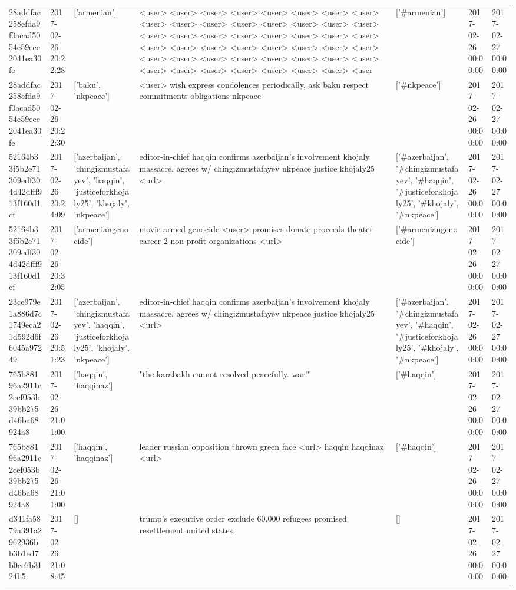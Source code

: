 \begin{tabular}{lllllll}
28addfac258efda9f0acad5054e59eee2041ea30fe & 2017-02-26 20:22:28 & ['armenian'] & <user> <user> <user> <user> <user> <user> <user> <user> <user> <user> <user> <user> <user> <user> <user> <user> <user> <user> <user> <user> <user> <user> <user> <user> <user> <user> <user> <user> <user> <user> <user> <user> <user> <user> <user> <user> <user> <user> <user> <user> <user> <user> <user> <user> <user> <user> <user> <user & ['#armenian'] & 2017-02-26 00:00:00 & 2017-02-27 00:00:00 \\
28addfac258efda9f0acad5054e59eee2041ea30fe & 2017-02-26 20:22:30 & ['baku', 'nkpeace'] & <user> wish express condolences periodically, ask baku respect commitments obligations nkpeace & ['#nkpeace'] & 2017-02-26 00:00:00 & 2017-02-27 00:00:00 \\
52164b33f5b2e71309edf304d42dfff913f160d1cf & 2017-02-26 20:24:09 & ['azerbaijan', 'chingizmustafayev', 'haqqin', 'justiceforkhojaly25', 'khojaly', 'nkpeace'] & editor-in-chief haqqin confirms azerbaijan's involvement khojaly massacre. agrees w/ chingizmustafayev nkpeace justice khojaly25 <url> & ['#azerbaijan', '#chingizmustafayev', '#haqqin', '#justiceforkhojaly25', '#khojaly', '#nkpeace'] & 2017-02-26 00:00:00 & 2017-02-27 00:00:00 \\
52164b33f5b2e71309edf304d42dfff913f160d1cf & 2017-02-26 20:32:05 & ['armeniangenocide'] & movie armed genocide <user> promises donate proceeds theater career 2 non-profit organizations <url> & ['#armeniangenocide'] & 2017-02-26 00:00:00 & 2017-02-27 00:00:00 \\
23ce979e1a886d7c1749eca21d592d6f6045a97249 & 2017-02-26 20:51:23 & ['azerbaijan', 'chingizmustafayev', 'haqqin', 'justiceforkhojaly25', 'khojaly', 'nkpeace'] & editor-in-chief haqqin confirms azerbaijan's involvement khojaly massacre. agrees w/ chingizmustafayev nkpeace justice khojaly25 <url> & ['#azerbaijan', '#chingizmustafayev', '#haqqin', '#justiceforkhojaly25', '#khojaly', '#nkpeace'] & 2017-02-26 00:00:00 & 2017-02-27 00:00:00 \\
765b88196a2911c2cef053b39bb275d46ba68924a8 & 2017-02-26 21:01:00 & ['haqqin', 'haqqinaz'] & "the karabakh cannot resolved peacefully. war!" & ['#haqqin'] & 2017-02-26 00:00:00 & 2017-02-27 00:00:00 \\
765b88196a2911c2cef053b39bb275d46ba68924a8 & 2017-02-26 21:01:00 & ['haqqin', 'haqqinaz'] & leader russian opposition thrown green face <url> haqqin haqqinaz <url> & ['#haqqin'] & 2017-02-26 00:00:00 & 2017-02-27 00:00:00 \\
d341fa5879a391a2962936bb3b1ed7b0ec7b3124b5 & 2017-02-26 21:08:45 & [] & trump's executive order exclude 60,000 refugees promised resettlement united states. & [] & 2017-02-26 00:00:00 & 2017-02-27 00:00:00 \\

\end{tabular}
